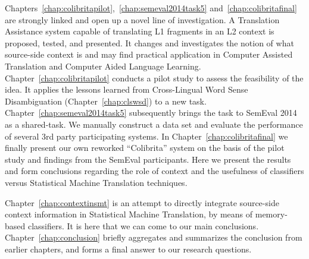 Chapters~\ref{chap:colibritapilot},~\ref{chap:semeval2014task5} and~\ref{chap:colibritafinal}
are strongly linked and open up a novel line of
investigation. A Translation Assistance system capable of translating L1
fragments in an L2 context is proposed, tested, and presented. It changes and
investigates the notion of what source-side context is and may find practical
application in Computer Assisted Translation and Computer Aided Language
Learning. Chapter~\ref{chap:colibritapilot} conducts a pilot study to assess
the feasibility of the idea. It applies the lessons learned from Cross-Lingual
Word Sense Disambiguation (Chapter~\ref{chap:clswsd}) to a new task.
Chapter~\ref{chap:semeval2014task5} subsequently brings the task to SemEval
2014 as a shared-task. We manually construct a data set and evaluate the
performance of several 3rd party participating systems.
In Chapter~\ref{chap:colibritafinal} we finally present our own reworked
``Colibrita'' system on the basis of the pilot study and findings from the
SemEval participants. Here we present the results and form conclusions
regarding the role of context and the usefulness of classifiers versus
Statistical Machine Translation techniques.

Chapter~\ref{chap:contextinsmt} is an attempt to directly integrate source-side
context information in Statistical Machine Translation, by means of
memory-based classifiers. It is here that we can come to our main conclusions.
Chapter~\ref{chap:conclusion} briefly aggregates and summarizes the
conclusion from earlier chapters, and forms a final answer to our research
questions. 


